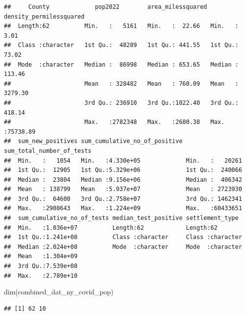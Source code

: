 \documentclass[
  12pt,
]{article}
\newenvironment{Shaded}{\begin{snugshade}}{\end{snugshade}}
\newcommand{\FunctionTok}[1]{\textcolor[rgb]{0.00,0.00,0.00}{#1}}
\newcommand{\NormalTok}[1]{#1}
\begin{document}
\begin{verbatim}
##     County             pop2022        area_milessquared density_permilessquared
##  Length:62          Min.   :   5161   Min.   :  22.66   Min.   :    3.01       
##  Class :character   1st Qu.:  48289   1st Qu.: 441.55   1st Qu.:   73.02       
##  Mode  :character   Median :  86998   Median : 653.65   Median :  113.46       
##                     Mean   : 328482   Mean   : 760.09   Mean   : 3279.30       
##                     3rd Qu.: 236910   3rd Qu.:1022.40   3rd Qu.:  418.14       
##                     Max.   :2782348   Max.   :2680.38   Max.   :75738.89       
##  sum_new_positives sum_cumulative_no_of_positive sum_total_number_of_tests
##  Min.   :   1054   Min.   :4.330e+05             Min.   :   20261         
##  1st Qu.:  12905   1st Qu.:5.329e+06             1st Qu.:  240066         
##  Median :  23804   Median :9.156e+06             Median :  406342         
##  Mean   : 138799   Mean   :5.937e+07             Mean   : 2723930         
##  3rd Qu.:  64600   3rd Qu.:2.758e+07             3rd Qu.: 1462341         
##  Max.   :2908643   Max.   :1.224e+09             Max.   :60433651         
##  sum_cumulative_no_of_tests median_test_positive settlement_type   
##  Min.   :1.036e+07          Length:62            Length:62         
##  1st Qu.:1.241e+08          Class :character     Class :character  
##  Median :2.024e+08          Mode  :character     Mode  :character  
##  Mean   :1.304e+09                                                 
##  3rd Qu.:7.539e+08                                                 
##  Max.   :2.789e+10
\end{verbatim}

\begin{Shaded}
\begin{Highlighting}[]
\FunctionTok{dim}\NormalTok{(combined\_dat\_ny\_covid\_pop)}
\end{Highlighting}
\end{Shaded}

\begin{verbatim}
## [1] 62 10
\end{verbatim}
\end{document}
